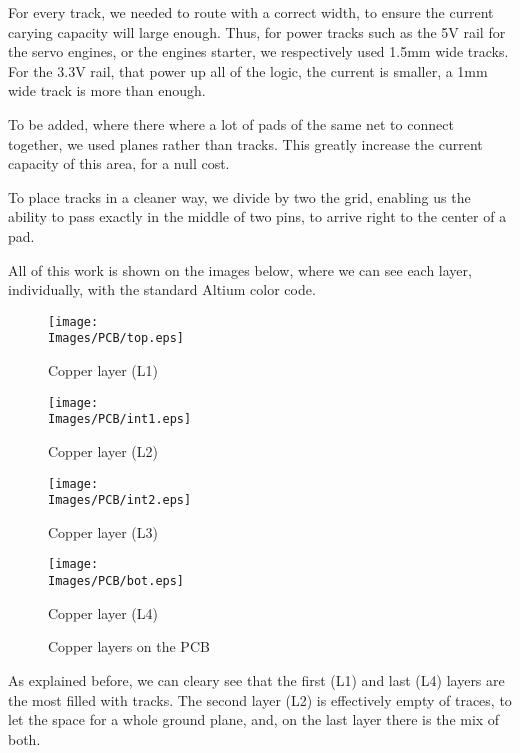 For every track, we needed to route with a correct width, to ensure the current carying capacity will
large enough. Thus, for power tracks such as the 5V rail for the servo engines, or the engines starter,
we respectively used 1.5mm wide tracks. For the 3.3V rail, that power up all of the logic, the current
is smaller, a 1mm wide track is more than enough.

To be added, where there where a lot of pads of the same net to connect together, we used planes rather
than tracks. This greatly increase the current capacity of this area, for a null cost.

To place tracks in a cleaner way, we divide by two the grid, enabling us the ability to pass exactly
in the middle of two pins, to arrive right to the center of a pad.

All of this work is shown on the images below, where we can see each layer, individually, with the
standard Altium color code.

\begin{figure}[!hbt]
    \centering
    \begin{minipage}[c]{\SmallSchematicWidth}
        \centering
        \texttt{[image: \\Images/PCB/top.eps]}
        \caption*{Copper layer (L1)}
    \end{minipage}%
    \hfill%
    \begin{minipage}[c]{\SmallSchematicWidth}
        \centering
        \texttt{[image: \\Images/PCB/int1.eps]}
        \caption*{Copper layer (L2)}
    \end{minipage}%
    \hfill%
    \begin{minipage}[c]{\SmallSchematicWidth}
        \centering
        \texttt{[image: \\Images/PCB/int2.eps]}
        \caption*{Copper layer (L3)}
    \end{minipage}%
    \hfill%
    \begin{minipage}[c]{\SmallSchematicWidth}
        \centering
        \texttt{[image: \\Images/PCB/bot.eps]}
        \caption*{Copper layer (L4)}
    \end{minipage}
    \label{img:layout}
    \caption{Copper layers on the PCB}
\end{figure}
\FloatBarrier

As explained before, we can cleary see that the first (L1) and last (L4) layers
are the most filled with tracks. The second layer (L2) is effectively empty of
traces, to let the space for a whole ground plane, and, on the last layer there
is the mix of both.

